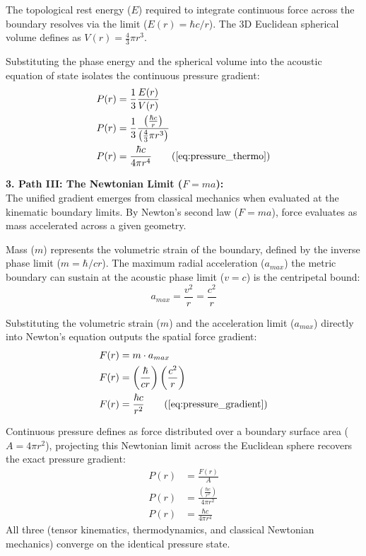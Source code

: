 The topological rest energy ($E$) required to integrate continuous force across the boundary resolves via the limit ($E(r) = \hbar c / r$). The 3D Euclidean spherical volume defines as $V(r) = \frac{4}{3}\pi r^3$. 

Substituting the phase energy and the spherical volume into the acoustic equation of state isolates the continuous pressure gradient:
\begin{align}
    P(r) &= \frac{1}{3} \frac{E(r)}{V(r)}   \\
    P(r) &= \frac{1}{3} \frac{\left( \frac{\hbar c}{r} \right)}{\left( \frac{4}{3}\pi r^3 \right)} \nonumber \\
    P(r) &= \frac{\hbar c}{4\pi r^4} \tag{\ref{eq:pressure_thermo}}
\end{align}

\textbf{3. Path III: The Newtonian Limit ($F=ma$):} \\
The unified gradient emerges from classical mechanics when evaluated at the kinematic boundary limits. By Newton's second law ($F = ma$), force evaluates as mass accelerated across a given geometry. 

Mass ($m$) represents the volumetric strain of the boundary, defined by the inverse phase limit ($m = \hbar / c r$).  The maximum radial acceleration ($a_{max}$) the metric boundary can sustain at the acoustic phase limit ($v = c$) is the centripetal bound:
\begin{equation}
    a_{max} = \frac{v^2}{r} = \frac{c^2}{r}
\end{equation}

Substituting the volumetric strain ($m$) and the acceleration limit ($a_{max}$) directly into Newton's equation outputs the spatial force gradient:
\begin{align}
    F(r) &= m \cdot a_{max} \nonumber \\
    F(r) &= \left( \frac{\hbar}{c r} \right) \left( \frac{c^2}{r} \right) \nonumber \\
    F(r) &= \frac{\hbar c}{r^2} \tag{\ref{eq:pressure_gradient}}
\end{align}

Continuous pressure defines as force distributed over a boundary surface area ($A = 4\pi r^2$), projecting this Newtonian limit across the Euclidean sphere recovers the exact pressure gradient:
\begin{align}
    P(r) &= \frac{F(r)}{A} \nonumber \\
    P(r) &= \frac{\left( \frac{\hbar c}{r^2} \right)}{4\pi r^2} \nonumber \\
    P(r) &= \frac{\hbar c}{4\pi r^4} 
\end{align}
All three (tensor kinematics, thermodynamics, and classical Newtonian mechanics) converge on the identical pressure state.

